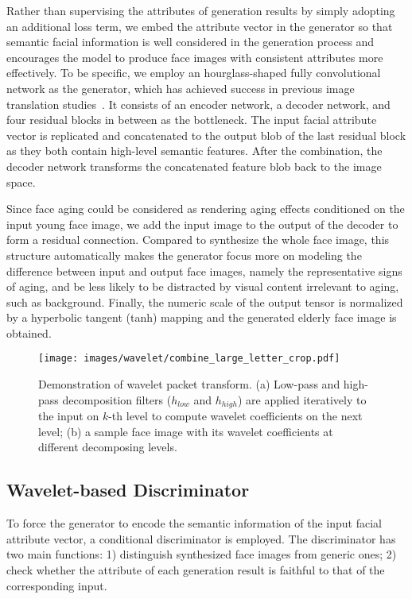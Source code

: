 \documentclass[10pt,twocolumn,letterpaper]{article}
\begin{document}
Rather than supervising the attributes of generation results by simply adopting an additional loss term, we embed the attribute vector in the generator so that semantic facial information is well considered in the generation process and encourages the model to produce face images with consistent attributes more effectively.
To be specific, we employ an hourglass-shaped fully convolutional network as the generator, which has achieved success in previous image translation studies~\cite{johnson2016perceptual,zhu2017unpaired}. It consists of an encoder network, a decoder network, and four residual blocks in between as the bottleneck.
The input facial attribute vector is replicated and concatenated to the output blob of the last residual block as they both contain high-level semantic features. After the combination, the decoder network transforms the concatenated feature blob back to the image space. 

Since face aging could be considered as rendering aging effects conditioned on the input young face image, we add the input image to the output of the decoder to form a residual connection. 
Compared to synthesize the whole face image, this structure automatically makes the generator focus more on modeling the difference between input and output face images, namely the representative signs of aging, and be less likely to be distracted by visual content irrelevant to aging, such as background.
Finally, the numeric scale of the output tensor is normalized by a hyperbolic tangent (tanh) mapping and the generated elderly face image is obtained.

\begin{figure}[t]
\centering\texttt{[image: images/wavelet/combine\_large\_letter\_crop.pdf]}
\caption{Demonstration of wavelet packet transform. (a) Low-pass and high-pass decomposition filters ($h_{low}$ and $h_{high}$) are applied iteratively to the input on $k$-th level to compute wavelet coefficients on the next level; (b) a sample face image with its wavelet coefficients at different decomposing levels.} 
\label{fig:waveletPacketTransform}
\end{figure}

\subsection{Wavelet-based Discriminator}
To force the generator to encode the semantic information of the input facial attribute vector, a conditional discriminator is employed. The discriminator has two main functions: 1) distinguish synthesized face images from generic ones; 2) check whether the attribute of each generation result is faithful to that of the corresponding input.
\end{document}

